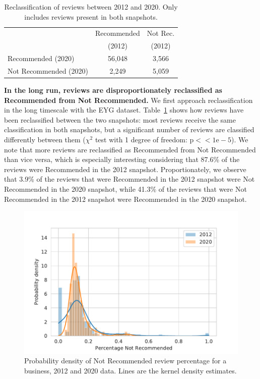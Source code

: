 \begin{table}[t]
    \centering
    \caption[Reclassification of reviews between 2012 and 2020]{Reclassification of reviews between 2012 and 2020. Only includes reviews present in both snapshots.}
    \label{tab:reclassification}
    \begin{tabular}{lcc}
		  \toprule
      & Recommended &  Not Rec. \\
			& (2012) & (2012) \\
			\midrule
      Recommended (2020) & 56,048 & 3,566 \\
      Not Recommended (2020)& 2,249 & 5,059\\
			\bottomrule
    \end{tabular}
\end{table}

\textbf{In the long run, reviews are disproportionately reclassified as Recommended from Not Recommended.}
We first approach reclassification in the long timescale with the EYG dataset. Table~\ref{tab:reclassification} shows how reviews have been reclassified between the two snapshots: most reviews receive the same classification in both snapshots, but a significant number of reviews are classified differently between them ($\chi^2$ test with 1 degree of freedom: $\text{p}<<1\text{e}-5$). We note that more reviews are reclassified as Recommended from Not Recommended than vice versa, which is especially interesting considering that 87.6\% of the reviews were Recommended in the 2012 snapshot. Proportionately, we observe that 3.9\% of the reviews that were Recommended in the 2012 snapshot were Not Recommended in the 2020 snapshot, while 41.3\% of the reviews that were Not Recommended in the 2012 snapshot were Recommended in the 2020 snapshot.

\begin{figure}[t]
    \centering
    \includegraphics[width=0.9\columnwidth]{chapters/reviews/figures/filtered_proportion_density.pdf}
    \caption[Probability density of Not Recommended review percentage for a business]{Probability density of Not Recommended review percentage for a business, 2012 and 2020 data. Lines are the kernel density estimates.}
    \label{fig:filtered_density}
\end{figure}

